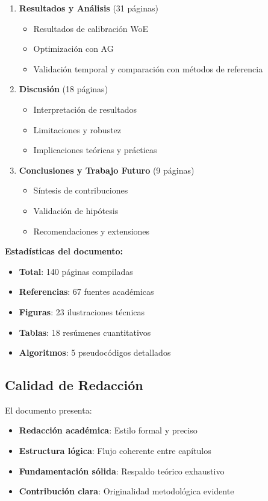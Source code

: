 \documentclass[12pt,letterpaper]{article}
\begin{document}
\begin{enumerate}
\item \textbf{Resultados y Análisis} (31 páginas)
    \begin{itemize}
    \item Resultados de calibración WoE
    \item Optimización con AG
    \item Validación temporal y comparación con métodos de referencia
    \end{itemize}

\item \textbf{Discusión} (18 páginas)
    \begin{itemize}
    \item Interpretación de resultados
    \item Limitaciones y robustez
    \item Implicaciones teóricas y prácticas
    \end{itemize}

\item \textbf{Conclusiones y Trabajo Futuro} (9 páginas)
    \begin{itemize}
    \item Síntesis de contribuciones
    \item Validación de hipótesis
    \item Recomendaciones y extensiones
    \end{itemize}
\end{enumerate}

\textbf{Estadísticas del documento:}
\begin{itemize}
\item \textbf{Total}: 140 páginas compiladas
\item \textbf{Referencias}: 67 fuentes académicas
\item \textbf{Figuras}: 23 ilustraciones técnicas
\item \textbf{Tablas}: 18 resúmenes cuantitativos
\item \textbf{Algoritmos}: 5 pseudocódigos detallados
\end{itemize}

\subsection{Calidad de Redacción}

El documento presenta:
\begin{itemize}
\item \textbf{Redacción académica}: Estilo formal y preciso
\item \textbf{Estructura lógica}: Flujo coherente entre capítulos
\item \textbf{Fundamentación sólida}: Respaldo teórico exhaustivo
\item \textbf{Contribución clara}: Originalidad metodológica evidente
\end{itemize}
\end{document}

